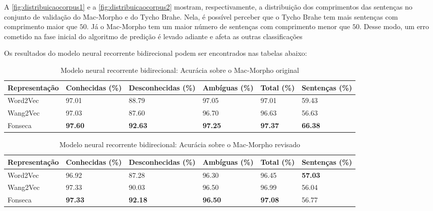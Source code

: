 A \autoref{fig:distribuicaocorpus1} e a \autoref{fig:distribuicaocorpus2} mostram, respectivamente, a distribuição dos comprimentos das sentenças no conjunto de validação do Mac-Morpho e do Tycho Brahe. Nela, é possível perceber que o Tycho Brahe tem mais sentenças com comprimento maior que $50$. Já o Mac-Morpho tem um maior número de sentenças com comprimento menor que $50$. Desse modo, um erro cometido na fase inicial do algoritmo de predição é levado adiante e afeta as outras classificações 

Os resultados do modelo neural recorrente bidirecional podem ser encontrados nas tabelas abaixo:

\begin{table}[!htb]
\footnotesize
\centering
\caption{Modelo neural recorrente bidirecional: Acurácia sobre o Mac-Morpho original}
\label{tab:acuraciam1_bidir}
\begin{tabular}{m{2.5cm}P{2.2cm}P{2.2cm}P{2.2cm}P{2.2cm}P{2.2cm}}
  \toprule
  \textbf{Representação} & \textbf{Conhecidas (\%)}  & \textbf{Desconhecidas (\%)} & \textbf{Ambíguas (\%)} & \textbf{Total (\%)} & \textbf{Sentenças (\%)} \\
  \midrule
  Word2Vec  & 97.01 & 88.79 & 97.05 & 97.01 & 59.43  \\ %
  Wang2Vec  & 97.03 & 87.60 & 96.70 & 96.63 & 56.63  \\ %
  Fonseca 	& \textbf{97.60} & \textbf{92.63} & \textbf{97.25} & \textbf{97.37} & \textbf{66.38}	 \\ %
  \bottomrule
\end{tabular}
\end{table}


\begin{table}[!htb]
\footnotesize
\centering
\caption{Modelo neural recorrente bidirecional: Acurácia sobre o Mac-Morpho revisado}
\label{tab:acuraciam3_bidir}
\begin{tabular}{m{2.5cm}P{2.2cm}P{2.2cm}P{2.2cm}P{2.2cm}P{2.2cm}}
  \toprule
  \textbf{Representação} & \textbf{Conhecidas (\%)}  & \textbf{Desconhecidas (\%)} & \textbf{Ambíguas (\%)} & \textbf{Total (\%)} & \textbf{Sentenças (\%)} \\
  \midrule
  Word2Vec  & 96.92 & 87.28 & 96.30 & 96.45 & \textbf{57.03} \\ %
  Wang2Vec  & 97.33 & 90.03 & 96.50 & 96.99 & 56.04 \\ %
  Fonseca  	& \textbf{97.33} & \textbf{92.18} & \textbf{96.50} & \textbf{97.08} & 56.77 \\ %
  \bottomrule
\end{tabular}
\end{table}



